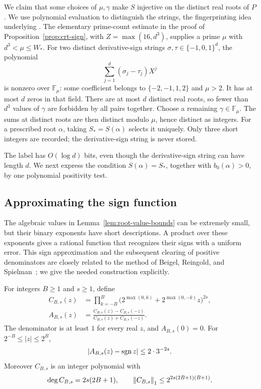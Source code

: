 We claim that some choices of $\mu,\gamma$ make $S$ injective on
the distinct real roots of $P$.  We use polynomial evaluation to
distinguish the strings, the fingerprinting idea underlying
\cite{Schwartz1980}.  The elementary prime-count estimate
in the proof of Proposition~\ref{prop:crt-sign}, with $Z=\max(16,d^3)$,
supplies a prime $\mu$ with
$d^3<\mu\le W_*$.  For two distinct derivative-sign strings
$\sigma,\tau\in\{-1,0,1\}^d$, the polynomial
\[
                       \sum_{j=1}^d(\sigma_j-\tau_j)X^j
\]
is nonzero over $\mathbb F_\mu$: some coefficient belongs to
$\{-2,-1,1,2\}$ and $\mu>2$.  It has at most $d$ zeros in that field.
There are at most $d$ distinct real roots, so fewer than $d^3$ values
of $\gamma$ are forbidden by all pairs together.  Choose a remaining
$\gamma\in\mathbb F_\mu$.  The sums at distinct roots are then distinct
modulo $\mu$, hence distinct as integers.  For a prescribed root
$\alpha$, taking $S_*=S(\alpha)$ selects it uniquely.  Only three short
integers are recorded; the derivative-sign string is never stored.

The label has $O(\log d)$ bits, even though the derivative-sign
string can have length $d$.  We next express the condition
$S(\alpha)=S_*$, together with $b_0(\alpha)>0$, by one polynomial
positivity test.

\subsection{Approximating the sign function}

The algebraic values in Lemma~\ref{lem:root-value-bounds} can be extremely
small, but their binary exponents have short descriptions.  A product
over these exponents gives a rational function that recognizes their
signs with a uniform error.  This sign approximation and the subsequent
clearing of positive denominators are closely related to the method of
Beigel, Reingold, and Spielman~\cite{BeigelReingoldSpielman1995}; we give
the needed construction explicitly.

\begin{lemma}\label{lem:rational-sign}
For integers $B\ge1$ and $s\ge1$, define
\begin{align*}
 C_{B,s}(z)
   &=\prod_{k=-B}^{B}
       \bigl(2^{\max(0,k)}+2^{\max(0,-k)}z\bigr)^{2s},\\
 A_{B,s}(z)
   &=\frac{C_{B,s}(z)-C_{B,s}(-z)}
           {C_{B,s}(z)+C_{B,s}(-z)}.
\end{align*}
The denominator is at least $1$ for every real $z$, and $A_{B,s}(0)=0$.
For $2^{-B}\le|z|\le2^B$,
\[
                  |A_{B,s}(z)-\operatorname{sgn} z|\le2\cdot3^{-2s}.
\]
Moreover $C_{B,s}$ is an integer polynomial with
\[
 \deg C_{B,s}=2s(2B+1),\qquad
 \left\lVert C_{B,s}\right\rVert_1\le2^{2s(2B+1)(B+1)}.
\]
\end{lemma}

